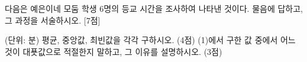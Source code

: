 다음은 예은이네 모둠 학생 $6$명의 등교 시간을 조사하여 나타낸 것이다. 물음에 답하고, 그 과정을 서술하시오. \mbox{[7점]}\par\smallskip\noindent\hfill{\small (단위: 분)}
 평균, 중앙값, 최빈값을 각각 구하시오. (4점)
 (1)에서 구한 값 중에서 어느 것이 대푯값으로 적절한지 말하고, 그 이유를 설명하시오. (3점)
